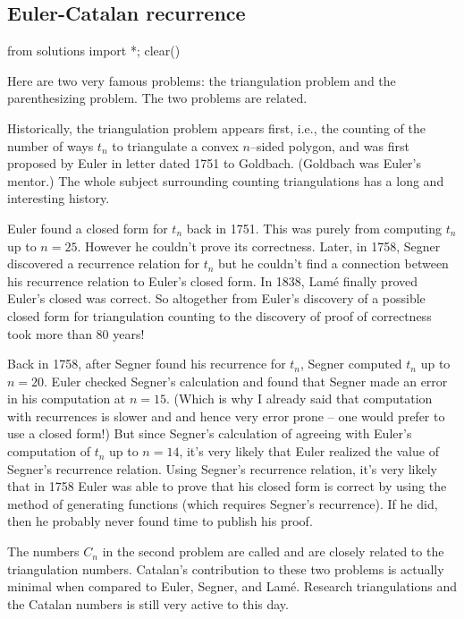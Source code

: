 \subsection{Euler-Catalan recurrence}
\begin{python0}
from solutions import *; clear() 
\end{python0}


Here are two very famous problems: the triangulation problem
and the parenthesizing problem.
The two problems are related.

Historically, the triangulation problem appears first, i.e.,
the counting of the number of ways $t_n$ to triangulate a convex $n$--sided
polygon,
and was first proposed by Euler in letter dated 1751 to Goldbach.
(Goldbach was Euler’s mentor.)
The whole subject surrounding counting triangulations has a
long and interesting history.

Euler found a closed form for $t_n$ back in 1751.
This was purely from computing $t_n$ up to $n = 25$.
However he couldn't prove its correctness.
Later, in 1758, Segner discovered a recurrence relation
for $t_n$ but he couldn't find a connection between his recurrence
relation to Euler's closed form.
In 1838, Lam\'e finally proved Euler's closed was correct.
So altogether from Euler's discovery of a possible closed form
for triangulation counting to the discovery of proof of correctness took more
than 80 years!

Back in 1758, after Segner found his recurrence for $t_n$,
Segner computed $t_n$ up to $n = 20$.
Euler checked Segner's calculation and found that Segner
made an error in his computation at $n = 15$.
(Which is why I already said that computation with
recurrences is slower and and hence
very error prone -- one would prefer to use a closed form!)
But since Segner's calculation of agreeing with Euler's computation
of $t_n$ up to $n = 14$, it's very likely that
Euler realized the value of Segner's recurrence relation.
Using Segner's recurrence relation, it's very likely that
in 1758 Euler was able to prove that his closed form is
correct by using the method of generating functions (which
requires Segner's recurrence).
If he did, then he probably never found time to publish
his proof.

The numbers $C_n$ in the second problem are called
 and are closely related to the
triangulation numbers.
Catalan's contribution to these two problems is actually
minimal when compared to Euler, Segner, and Lam\'e.
Research triangulations and the Catalan numbers is still very active
to this day.

